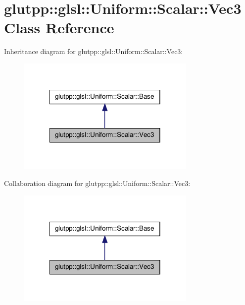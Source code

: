 \hypertarget{classglutpp_1_1glsl_1_1Uniform_1_1Scalar_1_1Vec3}{\section{glutpp\-:\-:glsl\-:\-:\-Uniform\-:\-:\-Scalar\-:\-:\-Vec3 \-Class \-Reference}
\label{classglutpp_1_1glsl_1_1Uniform_1_1Scalar_1_1Vec3}
}


\-Inheritance diagram for glutpp\-:\-:glsl\-:\-:\-Uniform\-:\-:\-Scalar\-:\-:\-Vec3\-:
\nopagebreak
\begin{figure}[H]
\begin{center}
\leavevmode
\includegraphics[width=246pt]{classglutpp_1_1glsl_1_1Uniform_1_1Scalar_1_1Vec3__inherit__graph}
\end{center}
\end{figure}


\-Collaboration diagram for glutpp\-:\-:glsl\-:\-:\-Uniform\-:\-:\-Scalar\-:\-:\-Vec3\-:
\nopagebreak
\begin{figure}[H]
\begin{center}
\leavevmode
\includegraphics[width=246pt]{classglutpp_1_1glsl_1_1Uniform_1_1Scalar_1_1Vec3__coll__graph}
\end{center}
\end{figure}
